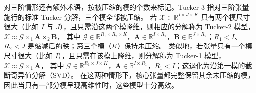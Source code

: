 \documentclass[11pt]{article}
\newcommand{\R}{\mathbb{R}}
\newcommand{\ten}[1]{\mathcal{#1}}
\newcommand{\mat}[1]{\mathbf{#1}}
\begin{document}
对三阶情形还有额外术语，按被压缩的模的个数来标记。Tucker-3 指对三阶张量施行的标准 Tucker 分解，三个模全部被压缩。
若 $\ten{X} \in \R^{I \times J \times K}$ 只有两个模尺寸很大（比如 $I$ 与 $J$），且只需沿这两个模降维，则相应的分解称为 Tucker-2 模型，$\ten{X} \approx \ten{G} \times_1 \mat{A} \times_2 \mat{B}$，
其中 $\ten{G} \in \R^{R_1 \times R_2 \times K}$，$\mat{A} \in \R^{I \times R_1}$，$\mat{B} \in \R^{J \times R_2}$；$R_1 < I$、$R_2 < J$ 是缩减后的秩；第三个模（$K$）保持未压缩。
类似地，若张量只有一个模尺寸很大（比如 $I$），且只需在该模上降维，则分解称为 Tucker-1 模型，$\ten{X} \approx \ten{G} \times_1 \mat{A}$，
其中 $\ten{G} \in \R^{R_1 \times J \times K}$，$\mat{A} \in \R^{I \times R_1}$，$R_1 < I$；这退化为沿第一模的截断奇异值分解（SVD）。
在这两种情形下，核心张量都完整保留其余未压缩的模，因此当只有一部分模呈现高维性时，这些模型十分高效。


\color{black}


\end{document}
